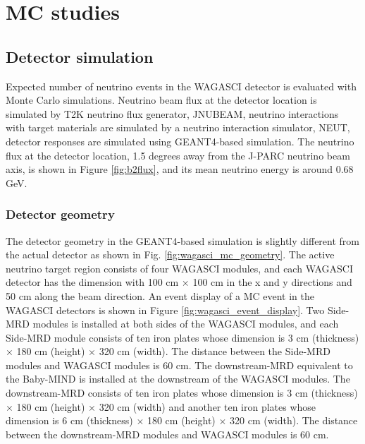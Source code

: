 \section{MC studies}
\label{sec:mc_study}

\subsection{Detector simulation}
Expected number of neutrino events in the WAGASCI detector is evaluated with Monte Carlo simulations. 
Neutrino beam flux at the detector location is simulated by T2K neutrino flux generator, JNUBEAM, neutrino interactions with target materials are simulated by a neutrino interaction simulator, NEUT, detector responses are simulated using GEANT4-based simulation.
The neutrino flux at the detector location, 1.5 degrees away from the J-PARC neutrino beam axis, is shown in Figure \ref{fig:b2flux}, and its mean neutrino energy is around 0.68 GeV.


\subsubsection{Detector geometry}
The detector geometry in the GEANT4-based simulation is slightly different from the actual detector as shown in Fig. \ref{fig:wagasci_mc_geometry}.
The active neutrino target region consists of four WAGASCI modules, and each WAGASCI detector has the dimension with 100 cm $\times$ 100 cm in the x and y directions and 50 cm along the beam direction.
An event display of a MC event in the WAGASCI detectors is shown in Figure \ref{fig:wagasci_event_display}.
Two Side-MRD modules is installed at both sides of the WAGASCI modules, and each Side-MRD module consists of ten iron plates whose dimension is 3 cm (thickness) $\times$ 180 cm (height) $\times$ 320 cm (width). 
The distance between the Side-MRD modules and WAGASCI modules is 60 cm.
The downstream-MRD equivalent to the Baby-MIND is installed at the downstream of the WAGASCI modules.
The downstream-MRD consists of ten iron plates whose dimension is  3 cm (thickness) $\times$ 180 cm (height) $\times$ 320 cm (width) and another ten iron plates whose dimension is 6 cm (thickness) $\times$ 180 cm (height) $\times$ 320 cm (width).
The distance between the downstream-MRD modules and WAGASCI modules is 60 cm.

